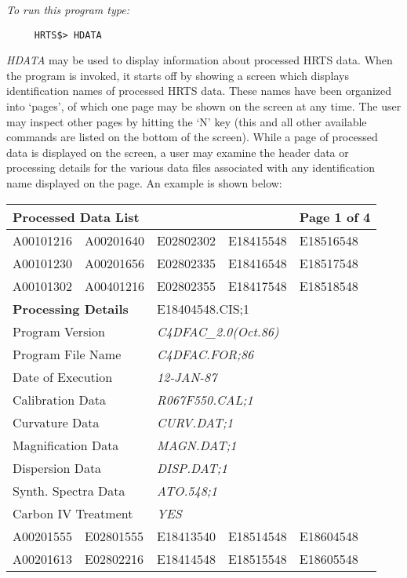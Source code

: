{\em To run this program type:}
\begin{verbatim}
     HRTS$> HDATA
\end{verbatim}
   {\em HDATA} may be used to display information about processed HRTS data.
    When the program is invoked, it starts off by showing a screen which
    displays identification names of processed HRTS data.  These names have
    been organized into `pages', of which one page may be shown on the
    screen at any time.  The user may inspect other pages by hitting the
    `N' key (this and all other available commands are listed on the bottom
    of the screen).
    While a page of processed data is displayed on the screen, a user
    may examine the header data or processing details for the various data
    files associated with any identification name displayed on the page.
    An example is shown below:
\begin{center}
\begin{tabular}{|l|l|l|l|l|}     
\hline
\multicolumn{4}{|l}{\bf Processed Data List} & \multicolumn{1}{l|}{\bf Page 1 of 
4} 
\\ \hline     
       A00101216 &  A00201640 &  E02802302 &  E18415548 &  E18516548  \\
       A00101230 &  A00201656 &  E02802335 &  E18416548 &  E18517548  \\
       A00101302 &  A00401216 &  E02802355 &  E18417548 &  E18518548  \\
\hline \hline
\multicolumn{2}{||l}{\bf Processing Details} & 
\multicolumn{3}{l||}{E18404548.CIS;1} 
\\  
\hline \hline
\multicolumn{2}{||l}{Program Version} & \multicolumn{3}{l||}{\em 
C4DFAC\_2.0(Oct.86)} \\              
\multicolumn{2}{||l}{Program File Name} & \multicolumn{3}{l||}{\em 
C4DFAC.FOR;86} \\                   
\multicolumn{2}{||l}{Date of Execution} & \multicolumn{3}{l||}{\em 12-JAN-87}    
 \\                   
\multicolumn{2}{||l}{ Calibration Data} & \multicolumn{3}{l||}{\em 
R067F550.CAL;1} \\                   
\multicolumn{2}{||l}{Curvature Data} & \multicolumn{3}{l||}{\em CURV.DAT;1} \\   
\multicolumn{2}{||l}{Magnification Data} & \multicolumn{3}{l||}{\em 
MAGN.DAT;1}\\                      
\multicolumn{2}{||l}{Dispersion Data} & \multicolumn{3}{l||}{\em DISP.DAT;1} \\                   
\multicolumn{2}{||l}{Synth. Spectra Data} & \multicolumn{3}{l||}{\em ATO.548;1} 
\\                       
\multicolumn{2}{||l}{Carbon IV Treatment} & \multicolumn{3}{l||}{\em YES}  \\                            
\hline \hline
       A00201555 &  E02801555 &  E18413540 &  E18514548 &  E18604548 \\
       A00201613 &  E02802216 &  E18414548 &  E18515548 &  E18605548 \\
\hline                
\end{tabular}
\end{center}                
